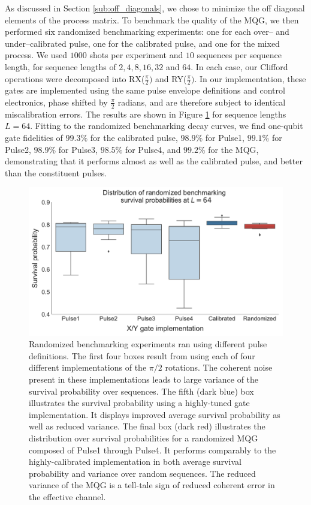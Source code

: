 \documentclass[aps,nofootinbib,pra,notitlepage,twocolumn]{revtex4-1}
\begin{document}
As discussed in Section \ref{sub:off_diagonals}, we chose to minimize the off diagonal elements of the process matrix. To benchmark the quality of the MQG, we then performed six randomized benchmarking experiments\cite{Magesan2011}: one for each over-- and under--calibrated pulse, one for the calibrated pulse, and one for the mixed process. We used $1000$ shots per experiment and $10$ sequences per sequence length, for sequence lengths of $2, 4, 8, 16, 32$ and $64$. In each case, our Clifford operations were decomposed into RX($\frac{\pi}{2})$ and RY($\frac{\pi}{2})$. In our implementation, these gates are implemented using the same pulse envelope definitions and control electronics, phase shifted by $\frac{\pi}{2}$ radians, and are therefore subject to identical miscalibration errors. The results are shown in Figure \ref{fig:rb} for sequence lengths $L=64$. Fitting to the randomized benchmarking decay curves, we find one-qubit gate fidelities of $99.3\%$ for the calibrated pulse, $98.9\%$ for Pulse1, $99.1\%$ for Pulse2, $98.9\%$ for Pulse3, $98.5\%$ for Pulse4, and $99.2\%$ for the MQG, demonstrating that it performs almost as well as the calibrated pulse, and better than the constituent pulses. 
\begin{figure}[t]
  \centering
  \includegraphics[width=\columnwidth]{rb_data.pdf}
  \caption{Randomized benchmarking experiments ran using different pulse definitions. The first four boxes result from using each of four different implementations of the ${\pi/2}$ rotations. The coherent noise present in these implementations leads to large variance of the survival probability over sequences. The fifth (dark blue) box illustrates the survival probability using a highly-tuned gate implementation. It displays improved average survival probability as well as reduced variance. The final box (dark red) illustrates the distribution over survival probabilities for a randomized MQG composed of Pulse1 through Pulse4. It performs comparably to the highly-calibrated implementation in both average survival probability and variance over random sequences. The reduced variance of the MQG is a tell-tale sign of reduced coherent error in the effective channel. }
  \label{fig:rb}
\end{figure}
\end{document}
